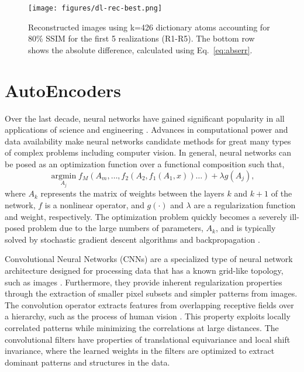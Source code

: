 \documentclass[a4paper,fleqn,12pt]{article}
\begin{document}
\begin{figure}[H]
    \centering
    \texttt{[image: figures/dl-rec-best.png]}
    \caption{Reconstructed images using k=426 dictionary atoms accounting for 80\% SSIM for the first 5 realizations (R1-R5). The bottom row shows the absolute difference, calculated using Eq.~\ref{eq:abserr}.}
    \label{fig:dl-rec-best}
\end{figure}

\pagebreak
\section*{AutoEncoders}
Over the last decade, neural networks have gained significant popularity in all applications of science and engineering \cite{goodfellow2016deep, zhang2022application}. Advances in computational power and data availability make neural networks candidate methods for great many types of complex problems including computer vision. In general, neural networks can be posed as an optimization function over a functional composition such that,
\begin{equation}
    \operatorname*{argmin}_{A_j} f_M (A_m, \dots, f_2(A_2, f_1(A_1, x))\dots)+\lambda g(A_j) ,
\end{equation}
where $A_k$ represents the matrix of weights between the layers $k$ and $k+1$ of the network, $f$ is a nonlinear operator, and $g(\cdot)$ and $\lambda$ are a regularization function and weight, respectively. The optimization problem quickly becomes a severely ill-posed problem due to the large numbers of parameters, $A_k$, and is typically solved by stochastic gradient descent algorithms and backpropagation \cite{bottou1991stochastic}. 

Convolutional Neural Networks (CNNs) are a specialized type of neural network architecture designed for processing data that has a known grid-like topology, such as images \cite{li2021survey}. Furthermore, they provide inherent regularization properties through the extraction of smaller pixel subsets and simpler patterns from images. The convolution operator extracts features from overlapping receptive fields over a hierarchy, such as the process of human vision \cite{luo2016understanding}. This property exploits locally correlated patterns while minimizing the correlations at large distances. The convolutional filters have properties of translational equivariance and local shift invariance, where the learned weights in the filters are optimized to extract dominant patterns and structures in the data. 
\end{document}

